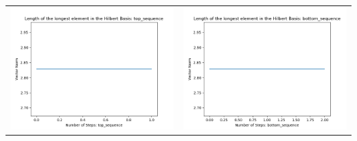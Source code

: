 \documentclass[10pt]{article}
\begin{document}
\begin{tabular}{c|c}
\begin{minipage}{.4\textwidth}
\includegraphics[width=\textwidth]{"DATA/5d/6 generators 1 bound A/top_sequence LENGTH"}
\end{minipage} &
\begin{minipage}{.4\textwidth}
\includegraphics[width=\textwidth]{"DATA/5d/6 generators 1 bound A bottomup/bottom_sequence LENGTH"}
\end{minipage}
\end{tabular}
\end{document}
